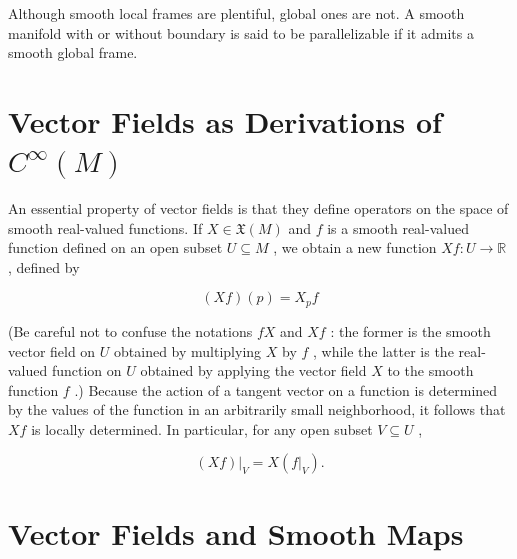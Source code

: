 \begin{definition}
\label{def:8-55-extra-3}
\leanok
Although smooth local frames are plentiful, global ones are not. A smooth manifold with or without boundary is said to be parallelizable if it admits a smooth global frame.
\end{definition}


\section{Vector Fields as Derivations of ${C}^{\infty }\left( M\right)$}

\begin{notation}
\label{not:8-56-extra-1}
\leanok
An essential property of vector fields is that they define operators on the space of smooth real-valued functions. If $X \in  \mathfrak{X}\left( M\right)$ and $f$ is a smooth real-valued function defined on an open subset $U \subseteq  M$ , we obtain a new function ${Xf} : U \rightarrow  \mathbb{R}$ , defined by

\[
\left( {Xf}\right) \left( p\right)  = {X}_{p}f
\]

(Be careful not to confuse the notations ${fX}$ and ${Xf}$ : the former is the smooth vector field on $U$ obtained by multiplying $X$ by $f$ , while the latter is the real-valued function on $U$ obtained by applying the vector field $X$ to the smooth function $f$ .) Because the action of a tangent vector on a function is determined by the values of the function in an arbitrarily small neighborhood, it follows that ${Xf}$ is locally determined. In particular, for any open subset $V \subseteq  U$ ,

\[
{\left. \left( Xf\right) \right| }_{V} = X\left( {\left. f\right| }_{V}\right) . \tag{8.4}
\]
\end{notation}


\section{Vector Fields and Smooth Maps}

